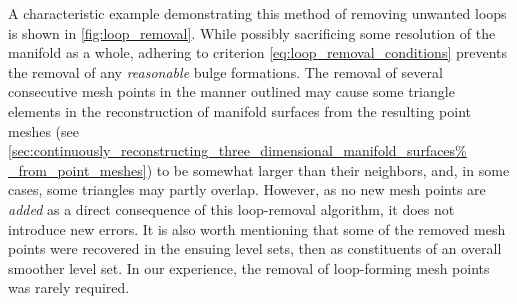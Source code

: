 A characteristic example demonstrating this method of removing unwanted
loops is shown in \cref{fig:loop_removal}. While possibly sacrificing some
resolution of the manifold as a whole, adhering to criterion
\eqref{eq:loop_removal_conditions} prevents the removal of any \emph{reasonable}
bulge formations. The removal of several consecutive mesh
points in the manner outlined may cause some triangle elements in the
reconstruction of manifold surfaces from the resulting point meshes (see
\cref{sec:continuously_reconstructing_three_dimensional_manifold_surfaces%
_from_point_meshes}) to be somewhat larger than their neighbors, and, in some
cases, some triangles may partly overlap. However, as no new mesh points are
\emph{added} as a direct consequence of this loop-removal algorithm, it does
not introduce new errors. It is also worth mentioning that some of the removed
mesh points were recovered in the ensuing level sets, then as constituents of
an overall smoother level set. In our experience, the removal of
loop-forming mesh points was rarely required.


